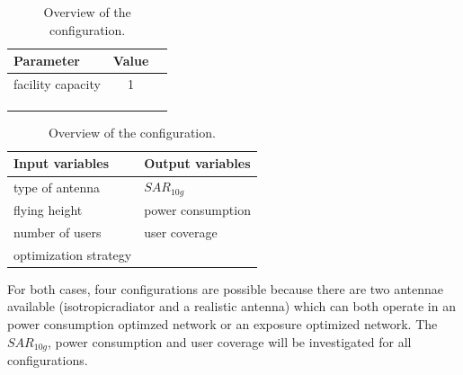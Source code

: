 \begin{table}[!htb]
    \begin{minipage}{.5\linewidth}
      \centering
        \begin{tabular}{|l|c|l|}
        \hline
        \textbf{Parameter}              & \textbf{Value}          \\   \hline 
        facility capacity               & 1        \\    
        &  \\ 
        & \\ 
        & \\ 
        \hline
        \end{tabular}
    \end{minipage}%
    \begin{minipage}{.5\linewidth}
      \centering
            \begin{tabular}{|l|l|}
            \hline
            \textbf{Input variables  }              & \textbf{Output variables}          \\   \hline 
            type of antenna                & $SAR_{10g}$               \\ 
            flying height                     & power consumption             \\ 
            number of users                & user coverage            \\
            optimization strategy         &                               \\ 
            \hline
            \end{tabular}
    \end{minipage} 
        \caption{Overview of the configuration.}
        \label{table:confOverviewScenario2}
\end{table}

For both cases, four configurations are possible because there are two antennae available (\gls{isotropicradiator} and a realistic antenna) which can both operate in an power consumption optimzed network or an exposure optimized 
network. The $SAR_{10g}$, power consumption and user coverage will be investigated for all configurations.




